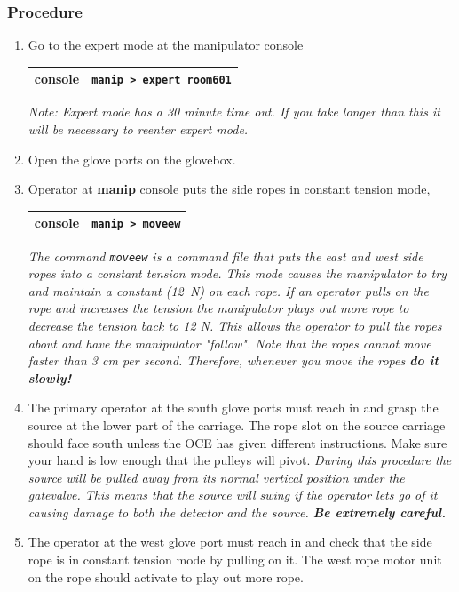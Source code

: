 \subsubsection{Procedure}
\begin{enumerate}
\item \CheckBox[name=aesr1]{} Go to the expert mode at the manipulator console
\begin{center}
\begin{tabular}{|c|c|}
\hline
console & \verb+manip > expert room601+\\
\hline
\end{tabular}
\end{center}
{\it Note: Expert mode has a 30 minute time out. If you take longer than this it will be necessary to reenter expert mode.}
\item \CheckBox[name=aesr2]{} Open the glove ports on the glovebox.
\item \CheckBox[name=aesr3]{} Operator at {\bf manip} console puts the side ropes in constant tension mode,
\begin{center}
\begin{tabular}{|c|c|}
\hline
console & \verb+manip > moveew+\\
\hline
\end{tabular}
\end{center}
{\it The command \verb+moveew+ is a command file that puts the east and west side ropes into a constant tension mode. This mode causes the manipulator to try and maintain a constant (12~N) on each rope. If an operator pulls on the rope and increases the tension the manipulator plays out more rope to decrease the tension back to 12 N. This allows the operator to pull the ropes about and have the manipulator "follow". Note that the ropes cannot move faster than 3 cm per second. Therefore, whenever you move the ropes {\bf do it slowly!}}
\item \CheckBox[name=aesr4]{} The primary operator at the south glove ports must reach in and grasp the source at the lower part of the carriage. The rope slot on the source carriage should face south unless the OCE has given different instructions. Make sure your hand is low enough that the pulleys will pivot. {\it During this procedure the source will be pulled away from its normal vertical position under the gatevalve. This means that the source will swing if the operator lets go of it causing damage to both the detector and the source. {\bf Be extremely careful.}}
\item \CheckBox[name=aesr5]{} The operator at the west glove port must reach in and check that the side rope is in constant tension mode by pulling on it. The west rope motor unit on the rope should activate to play out more rope.

\end{enumerate}
